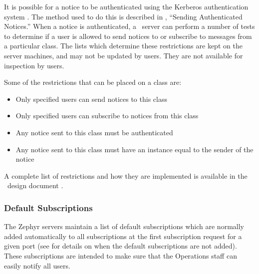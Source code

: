 It is possible for a notice to be authenticated using the Kerberos
authentication system \cite{kerberos-paper}.  The method used to do this
is described in , ``Sending Authenticated
Notices.''  When a notice is authenticated, a
\Zephyr\ server can perform a number of tests to determine if a user is
allowed to send notices to or subscribe to messages from a particular
class.  The lists which determine these restrictions are kept on the
server machines, and may not be updated by users.  They are not
available for inspection by users.

Some of the restrictions that can be placed on a class are:

\begin{itemize}
\item Only specified users can send notices to this class
\item Only specified users can subscribe to notices from this class
\item Any notice sent to this class must be authenticated
\item Any notice sent to this class must have an instance equal to the
sender of the notice
\end{itemize}

A complete list of restrictions and how they are implemented is
available in the \Zephyr\ design document \cite{zephyr-design}.

\subsubsection{Default Subscriptions}
\label{default-subscriptions}
The Zephyr servers maintain a list of default subscriptions which are
normally added automatically to all subscriptions at the first
subscription request for a given port (see  for
details on when the default subscriptions are not added).  These
subscriptions are intended to make sure that the Operations staff can
easily notify all users.
